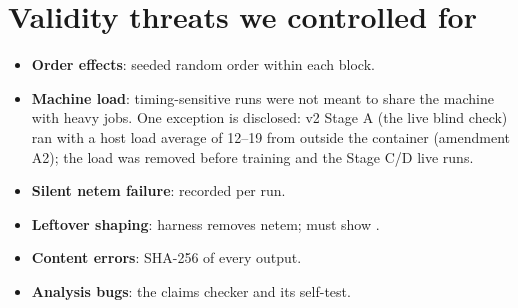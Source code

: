 \section{Validity threats we controlled for}
\begin{itemize}
\item \textbf{Order effects}: seeded random order within each block.
\item \textbf{Machine load}: timing-sensitive runs were not meant to share the machine with heavy jobs. One exception is disclosed: v2 Stage A (the live blind check) ran with a host load average of 12--19 from outside the container (amendment A2); the load was removed before training and the Stage C/D live runs.
\item \textbf{Silent netem failure}: recorded per run.
\item \textbf{Leftover shaping}: harness removes netem;  must show .
\item \textbf{Content errors}: SHA-256 of every output.
\item \textbf{Analysis bugs}: the claims checker and its self-test.
\end{itemize}
